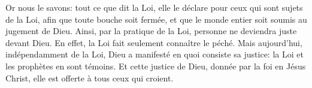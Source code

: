 Or nous le savons:
	tout ce que dit la Loi, elle le déclare pour ceux qui sont sujets de la Loi,
	afin que toute bouche soit fermée,
	et que le monde entier soit soumis au jugement de Dieu.
Ainsi, par la pratique de la Loi, personne ne deviendra juste devant Dieu.
	En effet, la Loi fait seulement connaître le péché.
Mais aujourd’hui, indépendamment de la Loi,
	Dieu a manifesté en quoi consiste sa justice:
	la Loi et les prophètes en sont témoins.
Et cette justice de Dieu, donnée par la foi en Jésus Christ,
	elle est offerte à tous ceux qui croient.

